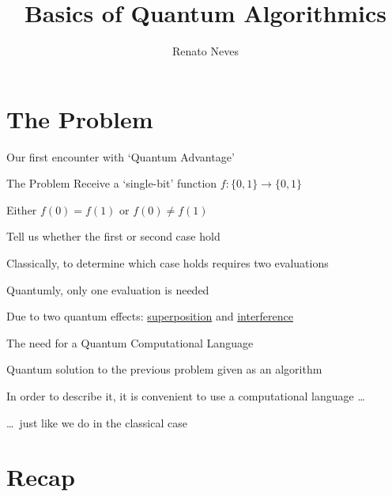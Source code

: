 \documentclass{beamer}
\author[Renato Neves]{Renato Neves}
\date{}
\begin{document}
\title{Basics of Quantum Algorithmics}

\frame[plain]{\titlepage}

\section{The Problem}

\begin{frame}{Our first encounter with `Quantum Advantage'} 

        \begin{block}{The Problem}
        Receive a `single-bit' function $f : \{0,1\} \to \{0,1\}$

        Either $f(0) = f(1)$ or $f(0) \not = f(1)$

        Tell us whether the first or second case hold
        \end{block}

        \vfill
        \pause
        Classically, to determine which case holds requires two evaluations

        \pause
        Quantumly, only one evaluation is needed 

        \pause
        Due to two quantum effects:
        \alert{\underline{superposition}} and 
        \alert{\underline{interference}}
\end{frame}

\begin{frame}{The need for a Quantum Computational Language}

        Quantum solution to the previous problem given as
        an \alert{algorithm}
        
        In order to describe it, it is convenient to use a
        computational language \dots
        
        \dots\ just like we do in the classical case
\end{frame}

\section{Recap}
\end{document}
